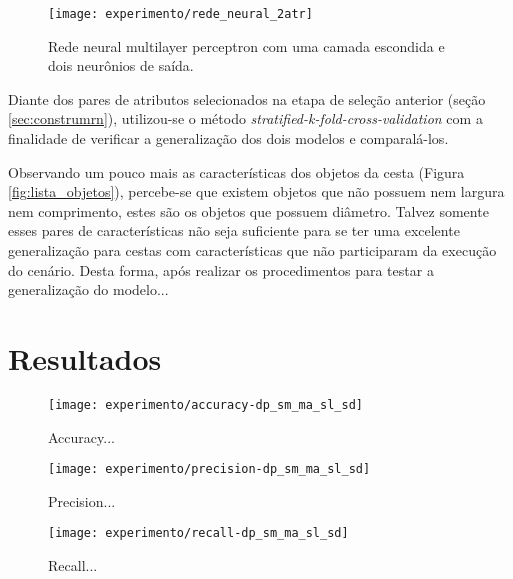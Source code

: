 \begin{figure}[!htb] \centering 
  \centering
  \texttt{[image: experimento/rede\_neural\_2atr]} 
  \caption{Rede neural multilayer perceptron com uma camada escondida e dois neurônios de saída. } 
  \label{fig:rede_neural_2atr}
\end{figure}

Diante dos pares de atributos selecionados na etapa de seleção anterior (seção \ref{sec:construmrn}), utilizou-se o método \textit{stratified-k-fold-cross-validation} com a finalidade de verificar a generalização dos dois modelos e comparalá-los.

Observando um pouco mais as características dos objetos da cesta (Figura \ref{fig:lista_objetos}), percebe-se que existem objetos que não possuem nem largura nem comprimento, estes são os objetos que possuem diâmetro. Talvez somente esses pares de características não seja suficiente para se ter uma excelente generalização para cestas com características que não participaram da execução do cenário. Desta forma, após realizar os procedimentos para testar a generalização do modelo... 

\section{Resultados}

\begin{figure}[!htb] \centering 
  \centering
  \texttt{[image: experimento/accuracy-dp\_sm\_ma\_sl\_sd]} 
  \caption{Accuracy... } 
  \label{fig:accuracy_result}
\end{figure}

\begin{figure}[!htb] \centering 
  \centering
  \texttt{[image: experimento/precision-dp\_sm\_ma\_sl\_sd]} 
  \caption{Precision... } 
  \label{fig:precision_result}
\end{figure}

\begin{figure}[!htb] \centering 
  \centering
  \texttt{[image: experimento/recall-dp\_sm\_ma\_sl\_sd]} 
  \caption{Recall... } 
  \label{fig:recall_result}
\end{figure}

 

